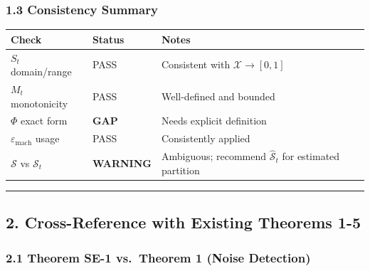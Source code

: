 \documentclass[
  12pt,
]{article}
\begin{document}
\subsubsection{1.3 Consistency Summary}\label{consistency-summary}

\begin{longtable}[]{@{}
  >{\raggedright\arraybackslash}p{}
  >{\raggedright\arraybackslash}p{}
  >{\raggedright\arraybackslash}p{}@{}}
\toprule\noalign{}
\begin{minipage}[b]{\linewidth}\raggedright
Check
\end{minipage} & \begin{minipage}[b]{\linewidth}\raggedright
Status
\end{minipage} & \begin{minipage}[b]{\linewidth}\raggedright
Notes
\end{minipage} \\
\midrule\noalign{}
\endhead
\bottomrule\noalign{}
\endlastfoot
\(S_t\) domain/range & PASS & Consistent with
\(\mathcal{X} \to [0,1]\) \\
\(M_t\) monotonicity & PASS & Well-defined and bounded \\
\(\Phi\) exact form & \textbf{GAP} & Needs explicit definition \\
\(\varepsilon_{\text{mach}}\) usage & PASS & Consistently applied \\
\(\mathcal{S}\) vs \(\mathcal{S}_t\) & \textbf{WARNING} & Ambiguous;
recommend \(\hat{\mathcal{S}}_t\) for estimated partition \\
\end{longtable}

\begin{center}\rule{0.5\linewidth}{0.5pt}\end{center}

\subsection{2. Cross-Reference with Existing Theorems
1-5}\label{cross-reference-with-existing-theorems-1-5}

\subsubsection{2.1 Theorem SE-1 vs.~Theorem 1 (Noise
Detection)}\label{theorem-se-1-vs.-theorem-1-noise-detection}
\end{document}
